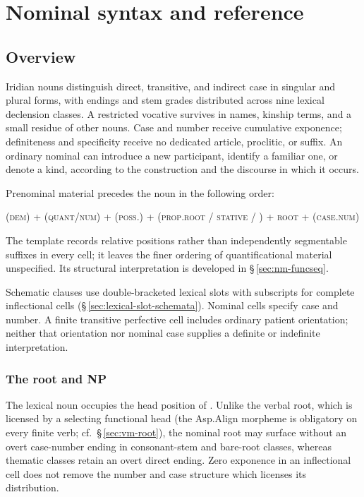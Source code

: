 \chapter{Nominal syntax and reference}\label{ch:nominal-syntax}\label{ch:nouns}

\section{Overview}
\label{sec:nm-overview}

Iridian nouns distinguish direct, transitive, and indirect case in singular
and plural forms, with endings and stem grades distributed across nine
lexical declension classes. A restricted vocative survives in names, kinship
terms, and a small residue of other nouns. Case and number receive cumulative
exponence; definiteness and specificity receive no dedicated article,
proclitic, or suffix. An ordinary nominal can introduce a new participant,
identify a familiar one, or denote a kind, according to the construction and
the discourse in which it occurs.

Prenominal material precedes the noun in the following order:
\begin{center}
(\textsc{dem}) + (\textsc{quant}/\textsc{num}) +
(\textsc{poss}.\Ind{}) + (\textsc{prop.root} / \textsc{stative} / ) +
\textsc{root} + (\textsc{case.num})
\end{center}
The template records relative positions rather than independently
segmentable suffixes in every cell; it leaves the finer ordering of
quantificational material unspecified. Its structural interpretation is
developed in §\,\ref{sec:nm-funcseq}.

Schematic clauses use double-bracketed lexical slots with subscripts for
complete inflectional cells (§\,\ref{sec:lexical-slot-schemata}). Nominal
cells specify case and number. A finite transitive perfective cell includes
ordinary patient orientation; neither that orientation nor nominal case
supplies a definite or indefinite interpretation.

\subsection{The root and NP}
\label{sec:nm-root}

The lexical noun occupies the head position of . Unlike the verbal
root, which is licensed by a selecting functional head (the Asp.Align morpheme
is obligatory on every finite verb; cf.\ §\,\ref{sec:vm-root}), the nominal root
may surface without an overt case-number ending in consonant-stem and bare-root
classes, whereas thematic classes retain an overt direct ending. Zero
exponence in an inflectional cell does not remove the number and case
structure which licenses its distribution.

